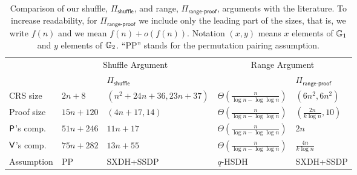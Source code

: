 
\begin{table}[h]
\begin{center}
\begin{minipage}{\textwidth}
\begin{center}
\begin{scriptsize}
\begin{tabular}{|l|ll|ll|}
\hline
                                                   & \multicolumn{2}{c|}{Shuffle Argument} & \multicolumn{2}{c|}{Range Argument} \\
                                                   & \cite{AC:GroLu07}          
 & $\Pi_\mathsf{shuffle}$
                                                   & \cite{PAIRING:RiaKohPre09} & $\Pi_{\mathsf{range}\mbox{-}\mathsf{proof}}$ 
\\ \hline\hline
\rule{0pt}{2.5ex}CRS size                          & $2n + 8$                   
              & $(n^2+24n+36,23n+37)$                
                                                   & $\Theta(\frac{n}{\log n-\log\log n})$ & $(6n^2,6n^2)$ \\
\rule{0pt}{2.5ex}Proof size                        & $15n + 120$                
            & $(4n+17,14)$
                                                   & $\Theta(\frac{n}{\log n-\log\log n})$ & $(\frac{2n}{k\log n},10)$ \\
\rule{0pt}{2.5ex}$\mathsf{P}$'s comp.                   & $51n + 246$               
             & $11n+17$
                                                   & $\Theta(\frac{n}{\log n-\log\log n})$ & $2n$ \\
\rule{0pt}{2.5ex}$\mathsf{V}$'s comp.                   & $75n + 282$               
              & $13n+55$
                                                   & $\Theta(\frac{n}{\log n-\log\log n})$ & $\frac{4n}{k\log n}$ \\
\rule{0pt}{2.5ex}Assumption                        & PP                        
                    & SXDH+SSDP
                                                   & $q$-HSDH                   & SXDH+SSDP \\\hline 
\end{tabular}
\end{scriptsize}
\end{center}
\caption{Comparison of our shuffle, $\Pi_\mathsf{shuffle}$, and range, $\Pi_{\mathsf{range}\mbox{-}\mathsf{proof}}$, arguments with the literature. To increase readability, for $\Pi_{\mathsf{range}\mbox{-}\mathsf{proof}}$ we include only the leading part of the sizes, that is, we write $f(n)$ and we mean $f(n)+o(f(n))$. Notation $(x,y)$ means $x$ elements of $\mathbb{G}_1$ and $y$ elements of $\mathbb{G}_2$. ``PP'' stands for the permutation pairing assumption.
}
\end{minipage}
\end{center}
\end{table}
